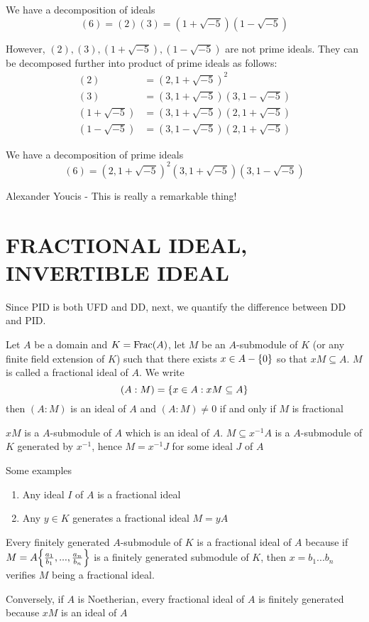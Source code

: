 We have a decomposition of ideals
$$
	(6) = (2) (3) = (1 + \sqrt{-5})(1 - \sqrt{-5})
$$

However, $(2), (3), (1 + \sqrt{-5}), (1 - \sqrt{-5})$ are not prime ideals. They can be decomposed further into product of prime ideals as follows:
\begin{align*}
	(2) &= (2, 1 + \sqrt{-5})^2 \\
	(3) &= (3, 1 + \sqrt{-5})(3, 1 - \sqrt{-5}) \\
	(1 + \sqrt{-5}) &= (3, 1 + \sqrt{-5})(2, 1 + \sqrt{-5}) \\
	(1 - \sqrt{-5}) &= (3, 1 - \sqrt{-5})(2, 1 + \sqrt{-5})
\end{align*}

We have a decomposition of prime ideals
$$
	(6) = (2, 1 + \sqrt{-5})^2 (3, 1 + \sqrt{-5})(3, 1 - \sqrt{-5})
$$

\begin{remark}
	Alexander Youcis - This is really a remarkable thing!
\end{remark}

\section{FRACTIONAL IDEAL, INVERTIBLE IDEAL}

Since PID is both UFD and DD, next, we quantify the difference between DD and PID.

\begin{definition}
	Let $A$ be a domain and $K = \operatorname{Frac}(A)$, let $M$ be an $A$-submodule of $K$ (or any finite field extension of $K$) such that there exists $x \in A - \{0\}$ so that $xM \subseteq A$. $M$ is called a fractional ideal of $A$. We write
	$$
		(A:M) = \{x \in A: xM \subseteq A\}
	$$
	then $(A:M)$ is an ideal of $A$ and $(A:M) \neq 0$ if and only if $M$ is fractional
\end{definition}

\begin{remark}
	$xM$ is a $A$-submodule of $A$ which is an ideal of $A$. $M \subseteq x^{-1} A$ is a $A$-submodule of $K$ generated by $x^{-1}$, hence $M = x^{-1} J$ for some ideal $J$ of $A$
	
	Some examples
	\begin{enumerate}
		\item Any ideal $I$ of $A$ is a fractional ideal
		\item Any $y \in K$ generates a fractional ideal $M = yA$
	\end{enumerate}
	
	Every finitely generated $A$-submodule of $K$ is a fractional ideal of $A$ because if $M = A \set*{\frac{a_1}{b_1}, ..., \frac{a_n}{b_n}}$ is a finitely generated submodule of $K$, then $x = b_1 ... b_n$ verifies $M$ being a fractional ideal.
	
	Conversely, if $A$ is Noetherian, every fractional ideal of $A$ is finitely generated because $xM$ is an ideal of $A$
\end{remark}

